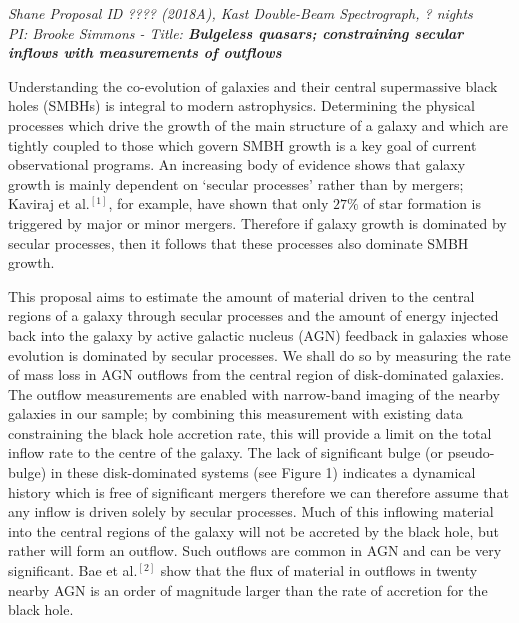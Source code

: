 \documentclass[12pt]{article}
\begin{document}
\noindent \emph{Shane Proposal ID ???? (2018A), Kast Double-Beam Spectrograph, ? nights} \\
\noindent \emph{PI: Brooke Simmons - Title: {\bf Bulgeless quasars; constraining secular inflows with measurements of outflows}} 
\vspace{0.5em}

\vspace{0.25em}

Understanding the co-evolution of galaxies and their central supermassive black holes (SMBHs) is integral to modern astrophysics. Determining the physical processes which drive the growth of the main structure of a galaxy and which are tightly coupled to those which govern SMBH growth is a key goal of current observational programs. An increasing body of evidence shows that galaxy growth is mainly dependent on `secular processes' rather than by mergers; Kaviraj et al.$^{[1]}$, for example, have shown that only $27\%$ of star formation is triggered by major or minor mergers. Therefore if galaxy growth is dominated by secular processes, then it follows that these processes also dominate SMBH growth.
\vspace{0.25em}

This proposal aims to estimate the amount of material driven to the central regions of a galaxy through secular processes and the amount of energy injected back into the galaxy by active galactic nucleus (AGN) feedback in galaxies whose evolution is dominated by secular processes. We shall do so by measuring the rate of mass loss in AGN outflows from the central region of disk-dominated galaxies. The outflow measurements are enabled with narrow-band imaging of the nearby galaxies in our sample; by combining this measurement with existing data constraining the black hole accretion rate, this will provide a limit on the total inflow rate to the centre of the galaxy. The lack of significant bulge (or pseudo-bulge) in these disk-dominated systems (see Figure 1) indicates a dynamical history which is free of significant mergers therefore we can therefore assume that any inflow is driven solely by secular processes. Much of this inflowing material into the central regions of the galaxy will not be accreted by the black hole, but rather will form an outflow. Such outflows are common in AGN and can be very significant. Bae et al.$^{[2]}$ show that the flux of material in outflows in twenty nearby AGN is an order of magnitude larger than the rate of accretion for the black hole.
\vspace{0.25em}
\end{document}

